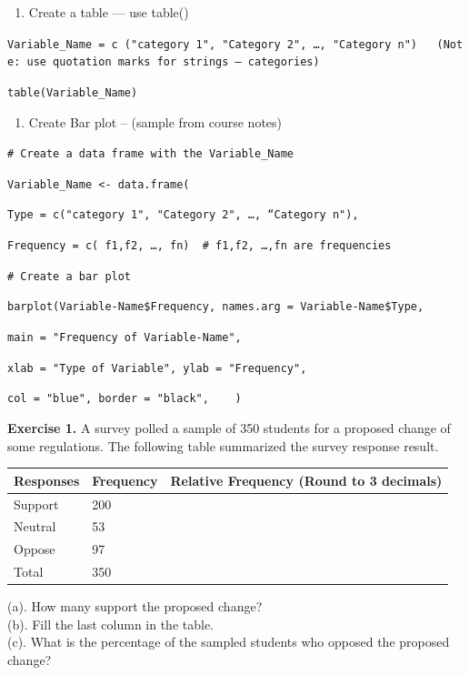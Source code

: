 \documentclass[
]{book}
\providecommand{\tightlist}{%
  \setlength{\itemsep}{0pt}\setlength{\parskip}{0pt}}
\begin{document}
\begin{enumerate}
\def\labelenumi{\arabic{enumi})}
\tightlist
\item
  Create a table --- use table()
\end{enumerate}

\texttt{Variable\_Name\ =\ c\ ("category\ 1",\ "Category\ 2",\ …,\ "Category\ n")\ \ \ (Note:\ use\ quotation\ marks\ for\ strings\ –\ categories)}

\texttt{table(Variable\_Name)}

\begin{enumerate}
\def\labelenumi{\arabic{enumi})}
\setcounter{enumi}{1}
\tightlist
\item
  Create Bar plot -- (sample from course notes)
\end{enumerate}

\texttt{\#\ Create\ a\ data\ frame\ with\ the\ Variable\_Name}

\texttt{Variable\_Name\ \textless{}-\ data.frame(}

\texttt{Type\ =\ c("category\ 1",\ "Category\ 2",\ …,\ “Category\ n"),}

\texttt{Frequency\ =\ c(\ f1,f2,\ …,\ fn)\ \ \#\ f1,f2,\ …,fn\ are\ frequencies}

\texttt{\#\ Create\ a\ bar\ plot}

\texttt{barplot(Variable-Name\$Frequency,\ names.arg\ =\ Variable-Name\$Type,}

\texttt{main\ =\ "Frequency\ of\ Variable-Name",}

\texttt{xlab\ =\ "Type\ of\ Variable",\ ylab\ =\ "Frequency",}

\texttt{col\ =\ "blue",\ border\ =\ "black",\ \ \ \ )}

\textbf{Exercise 1.} A survey polled a sample of 350 students for a proposed change of some regulations. The following table summarized the survey response result.

\begin{longtable}[]{@{}lll@{}}
\toprule\noalign{}
Responses & Frequency & Relative Frequency (Round to 3 decimals) \\
\midrule\noalign{}
\endhead
\bottomrule\noalign{}
\endlastfoot
Support & 200 & \\
Neutral & 53 & \\
Oppose & 97 & \\
Total & 350 & \\
\end{longtable}

(a). How many support the proposed change?\\
(b). Fill the last column in the table.\\
(c). What is the percentage of the sampled students who opposed the proposed change?
\end{document}
